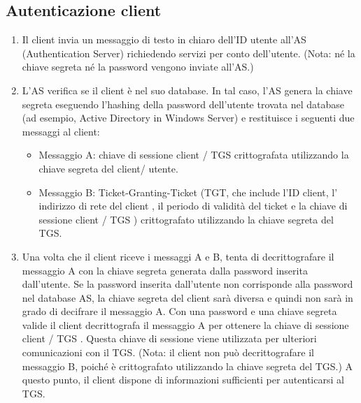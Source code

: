 \subsection{Autenticazione client}
\begin{enumerate}
    \item Il client invia un messaggio di testo in chiaro dell'ID utente all'AS (Authentication Server) richiedendo servizi per conto dell'utente. (Nota: né la chiave segreta né la password vengono inviate all'AS.)
    
    \item L'AS verifica se il client è nel suo database. In tal caso, l'AS genera la chiave segreta eseguendo l'hashing della password dell'utente trovata nel database (ad esempio, Active Directory in Windows Server) e restituisce i seguenti due messaggi al client:
    
    \begin{itemize}
        \item Messaggio A: chiave di sessione client / TGS crittografata utilizzando la chiave segreta del client/ utente.
        
        \item Messaggio B: Ticket-Granting-Ticket (TGT, che include l'ID client, l' indirizzo di rete del client , il periodo di validità del ticket e la chiave di sessione client / TGS ) crittografato utilizzando la chiave segreta del TGS.
    \end{itemize}
    
    \item Una volta che il client riceve i messaggi A e B, tenta di decrittografare il messaggio A con la chiave segreta generata dalla password inserita dall'utente. Se la password inserita dall'utente non corrisponde alla password nel database AS, la chiave segreta del client sarà diversa e quindi non sarà in grado di decifrare il messaggio A. Con una password e una chiave segreta valide il client decrittografa il messaggio A per ottenere la chiave di sessione client / TGS . Questa chiave di sessione viene utilizzata per ulteriori comunicazioni con il TGS. (Nota: il client non può decrittografare il messaggio B, poiché è crittografato utilizzando la chiave segreta del TGS.) A questo punto, il client dispone di informazioni sufficienti per autenticarsi al TGS.
\end{enumerate}
